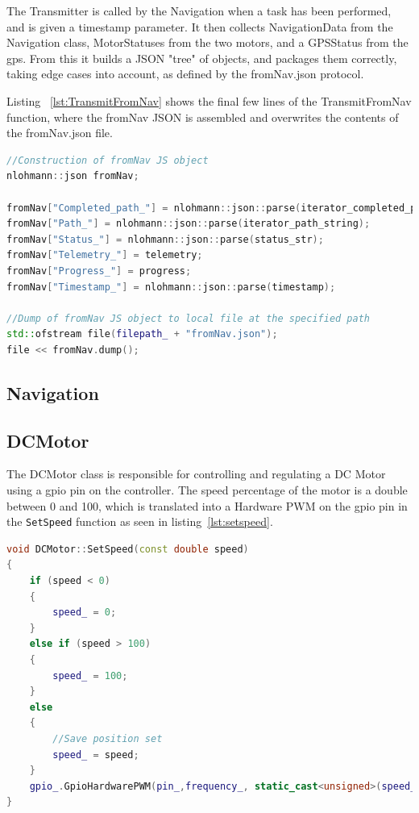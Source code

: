 The Transmitter is called by the Navigation when a task has been performed, and is given a timestamp parameter. It then collects NavigationData from the Navigation class, MotorStatuses from the two motors, and a GPSStatus from the gps. From this it builds a JSON "tree" of objects, and packages them correctly, taking edge cases into account, as defined by the fromNav.json protocol. 

Listing ~\ref{lst:TransmitFromNav} shows the final few lines of the TransmitFromNav function, where the fromNav JSON is assembled and overwrites the contents of the fromNav.json file.

\begin{lstlisting}[caption = {Last lines of the TransmitFromNav function in the Transmitter class}, captionpos=b, label={lst:TransmitFromNav}, language=C++,firstnumber=1]
//Construction of fromNav JS object
nlohmann::json fromNav;

fromNav["Completed_path_"] = nlohmann::json::parse(iterator_completed_path_string);
fromNav["Path_"] = nlohmann::json::parse(iterator_path_string);
fromNav["Status_"] = nlohmann::json::parse(status_str);
fromNav["Telemetry_"] = telemetry;
fromNav["Progress_"] = progress;
fromNav["Timestamp_"] = nlohmann::json::parse(timestamp);

//Dump of fromNav JS object to local file at the specified path
std::ofstream file(filepath_ + "fromNav.json");
file << fromNav.dump();
\end{lstlisting}

\subsection{Navigation}

\subsection{DCMotor}
The DCMotor class is responsible for controlling and regulating a DC Motor using a gpio pin on the controller. The speed percentage of the motor is a double between 0 and 100, which is translated into a Hardware PWM on the gpio pin in the \texttt{SetSpeed} function as seen in listing~\ref{lst:setspeed}. 

\begin{lstlisting}[caption = {Function responsible for DC Motor speed percentage to hardware PWM translation}, captionpos=b, label={lst:setspeed}, language=C++,firstnumber=1]
void DCMotor::SetSpeed(const double speed)
{
	if (speed < 0)
	{
		speed_ = 0;
	}
	else if (speed > 100)
	{
		speed_ = 100;
	}
	else
	{
		//Save position set
		speed_ = speed;
	}
	gpio_.GpioHardwarePWM(pin_,frequency_, static_cast<unsigned>(speed_* 10000));
}
\end{lstlisting}

